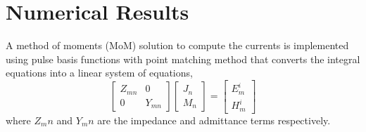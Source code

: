 \documentclass{ieeeaccess}
\renewcommand{\^}{\hat}  %
\begin{document}
\section{Numerical Results}
%
A method of moments (MoM) solution to compute the currents is implemented using pulse basis functions with point matching method \cite{Harrington1993} that converts the integral equations into a linear system of equations,
%
\begin{equation}
\begin{bmatrix}
  Z_{mn}   & 0 \\
  0        & Y_{mn}
\end{bmatrix}
\begin{bmatrix}
  J_n \\
  M_n
\end{bmatrix}
=
\begin{bmatrix}
  E_m^i \\
  H_m^i
\end{bmatrix}
\label{eq:MOM}
\end{equation}
%
where $Z_mn$ and $Y_mn$ are the impedance and admittance terms respectively.
\end{document}
